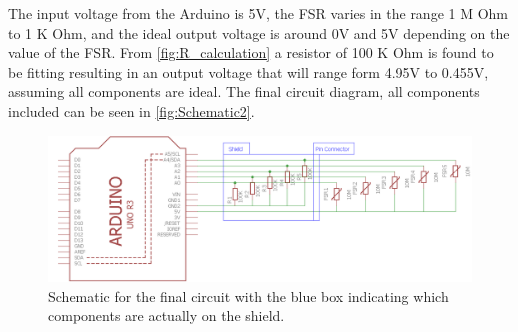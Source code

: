 The input voltage from the Arduino is 5V, the FSR varies in the range 1 M Ohm to 1 K Ohm, and the ideal output voltage is around 0V and 5V depending on the value of the FSR. From \autoref{fig:R_calculation} a resistor of 100 K Ohm is found to be fitting resulting in an output voltage that will range form 4.95V to 0.455V, assuming all components are ideal. The final circuit diagram, all components included can be seen in \autoref{fig:Schematic2}. 
\begin{figure}
\centering
\includegraphics[scale=0.5]{Figure/Schematic2.png}
\caption{Schematic for the final circuit with the blue box indicating which components are actually on the shield.}
\label{fig:Schematic2}
\end{figure}